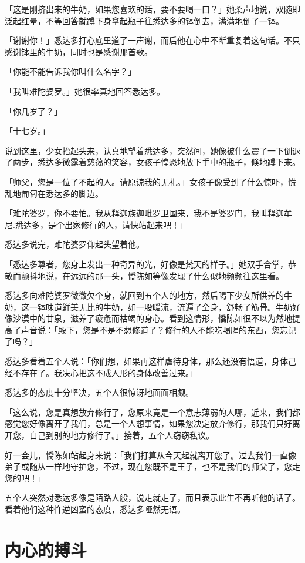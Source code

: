 \documentclass[twoside,openany]{book}
\begin{document}
「这是刚挤出来的牛奶，如果您喜欢的话，要不要喝一口？」她柔声地说，双随即泛起红晕，不等回答就蹲下身拿起瓶子往悉达多的钵倒去，满满地倒了一钵。

「谢谢你！」悉达多打心底里道了一声谢，而后他在心中不断重复着这句话。不只感谢钵里的牛奶，同时也是感谢那首歌。

「你能不能告诉我你叫什么名字？」

「我叫难陀婆罗。」她很率真地回答悉达多。

「你几岁了？」

「十七岁。」

说到这里，少女抬起头来，认真地望着悉达多，突然间，她像被什么震了一下倒退了两步，悉达多微露着慈蔼的笑容，女孩子惶恐地放下手中的瓶子，倏地蹲下来。

「师父，您是一位了不起的人。请原谅我的无礼。」女孩子像受到了什么惊吓，慌乱地匍匐在悉达多的脚边。

「难陀婆罗，你不要怕。我从释迦族迦毗罗卫国来，我不是婆罗门，我叫释迦牟尼.悉达多，是个出家修行的人，请快站起来吧！」

悉达多说完，难陀婆罗仰起头望着他。

「悉达多尊者，您身上发出一种奇异的光，好像是梵天的样子。」她双手合掌，恭敬而颤抖地说，在远远的那一头，憍陈如等像发现了什么似地频频往这里看。

悉达多向难陀婆罗微微欠个身，就回到五个人的地方，然后喝下少女所供养的牛奶，这一钵味道鲜美无比的牛奶，如一股暖流，流遍了全身，舒畅了筋骨。牛奶好像沙漠中的甘泉，滋养了疲惫而枯竭的身心。看到这情形，憍陈如很不以为然地提高了声音说：「殿下，您是不是不想修道了？修行的人不能吃喝腥的东西，您忘记了吗？」

悉达多看着五个人说：「你们想，如果再这样虐待身体，那么还没有悟道，身体己经不存在了。我决心把这不成人形的身体改善过来。」

悉达多的态度十分坚决，五个人很惊讶地面面相觑。

「这么说，您是真想放弃修行了，您原来竟是一个意志薄弱的人哪，近来，我们都感觉您好像离开了我们，总是一个人想事情，如果您决定放弃修行，那我们只好离开您，自己到别的地方修行了。」接着，五个人窃窃私议。

好一会儿，憍陈如站起身来说：「我们打算从今天起就离开您了。过去我们一直像弟子或随从一样地守护您，不过，现在您既不是王子，也不是我们的师父了，您走您的吧！」

五个人突然对悉达多像是陌路人般，说走就走了，而且表示此生不再听他的话了。看着他们这种忤逆凶蛮的态度，悉达多哑然无语。

\section{内心的搏斗}\label{sec1.10}
\end{document}
